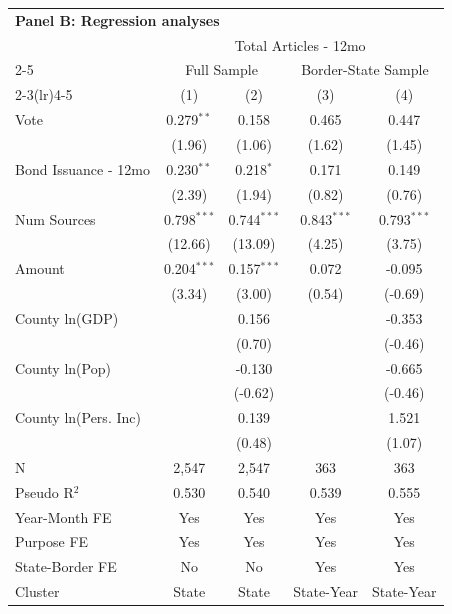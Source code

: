 \begingroup
\centering
\begin{tabular*}{\textwidth}{@{\extracolsep{\fill}}lcccc}
\multicolumn{5}{l}{\textbf{Panel B: Regression analyses}}\\

\addlinespace
   \toprule
    & \multicolumn{4}{c}{Total Articles - 12mo}\\
   \cmidrule(lr){2-5}
    & \multicolumn{2}{c}{Full Sample} & \multicolumn{2}{c}{Border-State Sample}\\
   \cmidrule(lr){2-3}\cmidrule(lr){4-5}
                        & (1)           & (2)           & (3)           & (4)\\  
   \midrule 
   Vote                 & 0.279$^{**}$  & 0.158         & 0.465         & 0.447\\   
                        & (1.96)       & (1.06)       & (1.62)       & (1.45)\\   
   Bond Issuance - 12mo & 0.230$^{**}$  & 0.218$^{*}$   & 0.171         & 0.149\\   
                        & (2.39)       & (1.94)       & (0.82)       & (0.76)\\   
   Num Sources          & 0.798$^{***}$ & 0.744$^{***}$ & 0.843$^{***}$ & 0.793$^{***}$\\   
                        & (12.66)      & (13.09)      & (4.25)       & (3.75)\\   
   Amount               & 0.204$^{***}$ & 0.157$^{***}$ & 0.072         & -0.095\\   
                        & (3.34)       & (3.00)       & (0.54)       & (-0.69)\\   
   County ln(GDP)       &               & 0.156         &               & -0.353\\   
                        &               & (0.70)       &               & (-0.46)\\   
   County ln(Pop)       &               & -0.130        &               & -0.665\\   
                        &               & (-0.62)      &               & (-0.46)\\   
   County ln(Pers. Inc) &               & 0.139         &               & 1.521\\   
                        &               & (0.48)       &               & (1.07)\\   
   \hline
   N         & 2,547         & 2,547         & 363           & 363\\  
   Pseudo R$^2$         & 0.530         & 0.540         & 0.539         & 0.555\\  
   Year-Month FE        & Yes           & Yes           & Yes           & Yes\\  
   Purpose FE           & Yes           & Yes           & Yes           & Yes\\  
   State-Border FE      & No            & No            & Yes           & Yes\\  
   Cluster              & State & State & State-Year & State-Year\\  
   \bottomrule
\end{tabular*}
\par\endgroup
